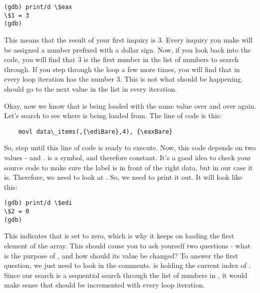 \begin{simpletyping}
\begin{lstlisting}
(gdb) print/d \$eax
\$1 = 3
(gdb)
\end{lstlisting}
\end{simpletyping}

This means that the result of your first inquiry is 3.  Every inquiry
you make will be assigned a number prefixed with a dollar sign.  Now,
if you look back into the code, you will find that 3 is the first number
in the list of numbers to search through.  If you step through the loop
a few more times, you will find that in every loop iteration {\eaxReg} has the number 3.  This is not what should be happening.  {\eaxReg} should go to the next 
value in the list in every iteration.

Okay, now we know that {\eaxReg} is being loaded with the same value over
and over again.  Let's search to see where {\eaxReg} is being loaded
from.  The line of code is this:

\begin{simpletyping}
\begin{lstlisting}
	movl data\_items(,{\ediBare},4), {\eaxBare}
\end{lstlisting}
\end{simpletyping}

So, step until this line of code is ready to execute.  Now, this code depends
on two values -  and {\ediReg}.  
 is a symbol, and therefore constant.  It's a
good idea to check your source code to make sure the label is in front of the
right data, but in our case it is.  Therefore, we need to look at {\ediReg}.  So,
we need to print it out.  It will look like this:

\begin{simpletyping}
\begin{lstlisting}
(gdb) print/d \$edi
\$2 = 0
(gdb)
\end{lstlisting}
\end{simpletyping}

This indicates that {\ediReg} is set to zero, which is why it keeps on loading the
first element of the array.  This should cause you to ask yourself two 
questions - what is the purpose of {\ediReg}, and how should its value be changed?
To answer the first question, we just need to look in the comments.  
{\ediReg} is holding the current index of .  
Since our search is a sequential search through the list of numbers in 
, it would make sense that {\ediReg} should
be incremented with every loop iteration.

